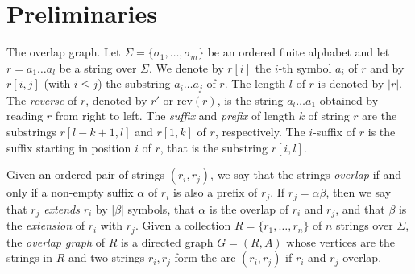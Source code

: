 \documentclass[runningheads,envcountsame,a4paper]{llncs}
\makeatletter
\newcommand{\paragrafo}{%
  \@startsection{paragraph}{4}{\z@ }{-7\p@ \@plus -4\p@ \@minus -4\p@
  }{-0.5em \@plus -0.22em \@minus -0.1em}{\normalfont \normalsize \itshape
  }
}
\newcommand{\rev}{\ensuremath{\mathrm{rev}}}
\makeatother
\begin{document}
\section{Preliminaries}

\paragrafo{The overlap graph.}
Let $\Sigma = \{\sigma_1, \dots, \sigma_m\}$ be an ordered finite
alphabet and let $r = a_1 \dots a_l$ be a string over $\Sigma$.
We denote by $r[i]$ the $i$-th symbol $a_i$ of $r$ and by $r[i,j]$ (with
$i \leq j$) the substring $a_i \dots a_j$ of $r$.
The length $l$ of $r$ is denoted by $|r|$.
The \emph{reverse} of $r$, denoted by $r'$ or $\rev(r)$, is the string
$a_l \dots a_1$ obtained by reading $r$ from right to left.
The \emph{suffix} and \emph{prefix} of length $k$ of string $r$ are the
substrings $r[l-k +1, l]$ and $r[1, k]$ of $r$, respectively.
The $i$-suffix of $r$ is the suffix starting in position $i$ of $r$,
that is the substring $r[i, l]$.

Given an ordered pair of strings $(r_i, r_j)$, we say that the strings
\emph{overlap} if and only if a non-empty suffix $\alpha$ of $r_i$ is
also a prefix of $r_j$.
If $r_j = \alpha \beta$, then we say that $r_j$ \emph{extends} $r_i$ by
$|\beta|$ symbols, that $\alpha$ is the overlap of $r_i$ and $r_j$, and
that $\beta$ is the \emph{extension} of $r_i$ with $r_j$.
Given a collection $R = \{r_1, \dots, r_n\}$ of $n$ strings over
$\Sigma$, the \emph{overlap graph} of $R$ is a directed graph $G=(R, A)$
whose vertices are the strings in $R$ and two strings
$r_i, r_j$ form the arc $(r_i, r_j)$ if $r_i$ and $r_j$ overlap.
\end{document}
